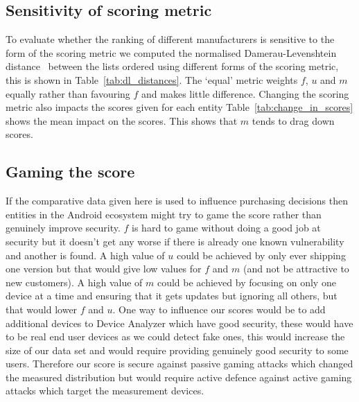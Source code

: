 \subsection{Sensitivity of scoring metric}
\daTabDLDistances
\daTabChangeInScores
To evaluate whether the ranking of different manufacturers is sensitive to the form of the scoring metric we computed the normalised Damerau-Levenshtein distance~\cite{Bard2007} between the lists ordered using different forms of the scoring metric, this is shown in Table~\ref{tab:dl_distances}.
The `equal' metric weights $f$, $u$ and $m$ equally rather than favouring $f$ and makes little difference.
Changing the scoring metric also impacts the scores given for each entity Table~\ref{tab:change_in_scores} shows the mean impact on the scores.
This shows that $m$ tends to drag down scores.

\subsection{Gaming the score}
If the comparative data given here is used to influence purchasing decisions then entities in the Android ecosystem might try to game the score rather than genuinely improve security.
$f$ is hard to game without doing a good job at security but it doesn't get any worse if there is already one known vulnerability and another is found.
A high value of $u$ could be achieved by only ever shipping one version but that would give low values for $f$ and $m$ (and not be attractive to new customers).
A high value of $m$ could be achieved by focusing on only one device at a time and ensuring that it gets updates but ignoring all others, but that would lower $f$ and $u$.%
One way to influence our scores would be to add additional devices to Device Analyzer which have good security, these would have to be real end user devices as we could detect fake ones, this would increase the size of our data set and would require providing genuinely good security to some users.
Therefore our score is secure against passive gaming attacks which changed the measured distribution but would require active defence against active gaming attacks which target the measurement devices.